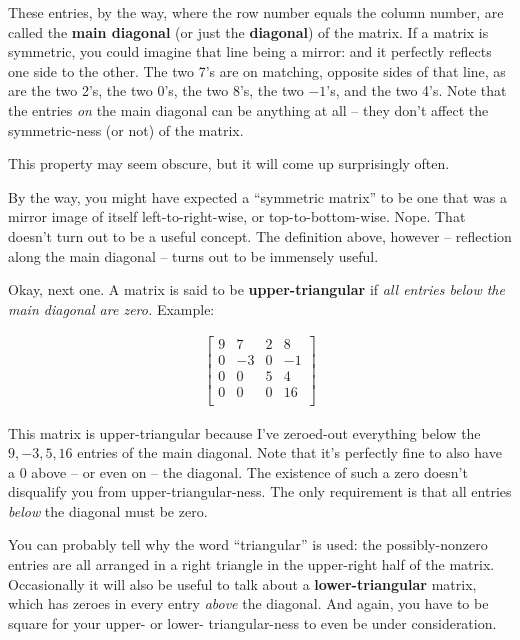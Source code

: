 
These entries, by the way, where the row number equals the column number, are
called the \textbf{main diagonal} (or just the \textbf{diagonal}) of the
matrix. If a matrix is symmetric, you could imagine that line being a mirror:
and it perfectly reflects one side to the other. The two 7's are on matching,
opposite sides of that line, as are the two 2's, the two 0's, the two 8's, the
two $-1$'s, and the two 4's. Note that the entries \textit{on} the main
diagonal can be anything at all -- they don't affect the symmetric-ness (or
not) of the matrix.

This property may seem obscure, but it will come up surprisingly often.

By the way, you might have expected a ``symmetric matrix'' to be one that was a
mirror image of itself left-to-right-wise, or top-to-bottom-wise. Nope. That
doesn't turn out to be a useful concept. The definition above, however --
reflection along the main diagonal -- turns out to be immensely useful.

\medskip

Okay, next one. A matrix is said to be \textbf{upper-triangular} if \textit{all
entries below the main diagonal are zero.} Example:

\vspace{-.15in}
\begin{align*}
\begin{bmatrix}
9 & 7 & 2 & 8\\
0 & -3 & 0 & -1\\
0 & 0 & 5 & 4 \\
0 & 0 & 0 & 16 \\
\end{bmatrix}
\end{align*}
\vspace{-.15in}

This matrix is upper-triangular because I've zeroed-out everything below the
$9,-3,5,16$ entries of the main diagonal. Note that it's perfectly fine to also
have a 0 above -- or even on -- the diagonal. The existence of such a zero
doesn't disqualify you from upper-triangular-ness. The only requirement is that
all entries \textit{below} the diagonal must be zero.


You can probably tell why the word ``triangular'' is used: the possibly-nonzero
entries are all arranged in a right triangle in the upper-right half of the
matrix. Occasionally it will also be useful to talk about a
\textbf{lower-triangular} matrix, which has zeroes in every entry
\textit{above} the diagonal. And again, you have to be square for your upper-
or lower- triangular-ness to even be under consideration.

